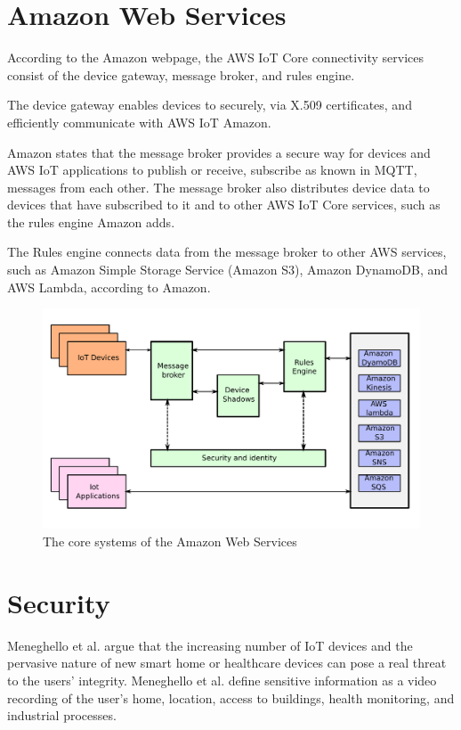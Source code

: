 \section{Amazon Web Services}
According to the Amazon webpage, the AWS IoT Core connectivity services consist of the device gateway, message broker, and rules engine\cite{AWS2021}.

The device gateway enables devices to securely, via X.509 certificates, and efficiently communicate with AWS IoT Amazon.

Amazon states that the message broker provides a secure way for devices and AWS IoT applications to publish or receive, subscribe as known in MQTT, messages from each other.
The message broker also distributes device data to devices that have subscribed to it and to other AWS IoT Core services, such as the rules engine Amazon adds. 

The Rules engine connects data from the message broker to other AWS services, such as Amazon Simple Storage Service (Amazon S3), Amazon DynamoDB, and AWS Lambda, according to Amazon.

\begin{figure}[H]
    \centering
    \includegraphics[width=\textwidth]{Pictures/aws.pdf} 
    \caption{The core systems of the Amazon Web Services}
    \label{diagram AWS}
\end{figure}

\section{Security}
Meneghello et al. argue that the increasing number of IoT devices and the pervasive nature of new smart home or healthcare devices can pose a real threat to the users' integrity\cite{Meneghello2019}.
Meneghello et al. define sensitive information as a video recording of the user's home, location, access to buildings, health monitoring, and industrial processes.

